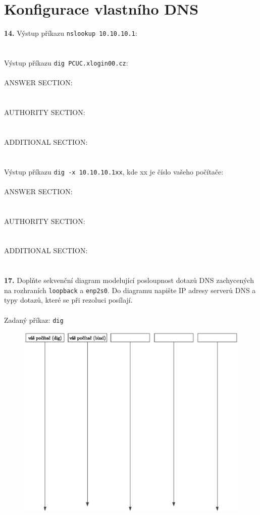 \section{Konfigurace vlastního DNS}
\textbf{14.} Výstup příkazu \texttt{nslookup 10.10.10.1}:
\\
\\
\\
\hspace*{0.7cm} Výstup příkazu \texttt{dig PCUC.xlogin00.cz}:
\\
\\
\hspace*{0.8cm}ANSWER SECTION:
\\
\\
\\
\hspace*{0.8cm}AUTHORITY SECTION:
\\
\\
\\
\hspace*{0.8cm}ADDITIONAL SECTION:
\\
\\
\\
\hspace*{0.7cm} Výstup příkazu \texttt{dig -x 10.10.10.1xx}, kde xx je číslo vašeho počítače:
\\
\\
\hspace*{0.8cm}ANSWER SECTION:
\\
\\
\\
\hspace*{0.8cm}AUTHORITY SECTION:
\\
\\
\\
\hspace*{0.8cm}ADDITIONAL SECTION:
\\
\\
\\
\textbf{17.} Doplňte sekvenční diagram modelující posloupnost dotazů DNS zachycených na rozhraních \texttt{loopback} a \texttt{enp2s0}. Do diagramu napište IP adresy serverů DNS a typy dotazů, které se při rezoluci posílají. 
\\
\\
\hspace*{0.8cm}Zadaný příkaz: \texttt{dig }\underline{\hspace{4.5cm}}
\begin{figure}[h]
	\centering
	\includegraphics[bb=0 365 550 130, clip=true]{dia.eps}
\end{figure}
